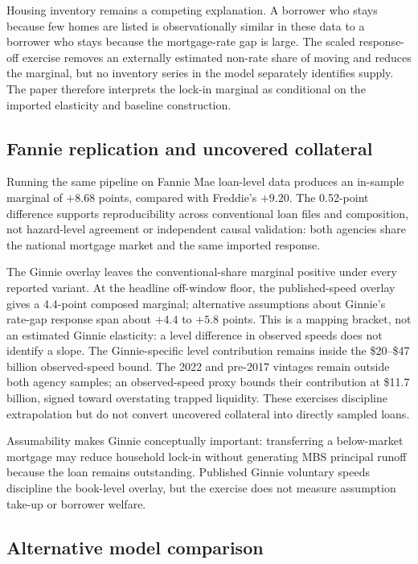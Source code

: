 Housing inventory remains a competing explanation. A borrower who stays because few homes are listed is observationally similar in these data to a borrower who stays because the mortgage-rate gap is large. The scaled response-off exercise removes an externally estimated non-rate share of moving and reduces the marginal, but no inventory series in the model separately identifies supply. The paper therefore interprets the lock-in marginal as conditional on the imported elasticity and baseline construction.

\subsection{Fannie replication and uncovered collateral}

Running the same pipeline on Fannie Mae loan-level data produces an in-sample marginal of $+8.68$ points, compared with Freddie's $+9.20$. The 0.52-point difference supports reproducibility across conventional loan files and composition, not hazard-level agreement or independent causal validation: both agencies share the national mortgage market and the same imported response.

The Ginnie overlay leaves the conventional-share marginal positive under every reported variant. At the headline off-window floor, the published-speed overlay gives a 4.4-point composed marginal; alternative assumptions about Ginnie's rate-gap response span about $+4.4$ to $+5.8$ points. This is a mapping bracket, not an estimated Ginnie elasticity: a level difference in observed speeds does not identify a slope. The Ginnie-specific level contribution remains inside the \$20--\$47 billion observed-speed bound. The 2022 and pre-2017 vintages remain outside both agency samples; an observed-speed proxy bounds their contribution at \$11.7 billion, signed toward overstating trapped liquidity. These exercises discipline extrapolation but do not convert uncovered collateral into directly sampled loans.

Assumability makes Ginnie conceptually important: transferring a below-market mortgage may reduce household lock-in without generating MBS principal runoff because the loan remains outstanding. Published Ginnie voluntary speeds discipline the book-level overlay, but the exercise does not measure assumption take-up or borrower welfare.

\subsection{Alternative model comparison}


